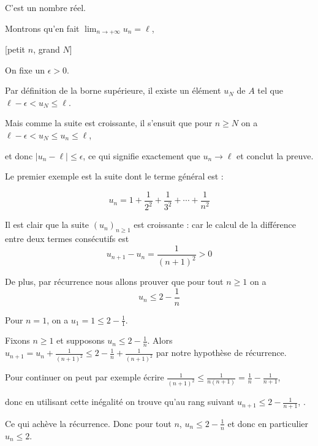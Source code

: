 C'est un nombre réel.

\change

Montrons qu'en fait $\lim_{n\to +\infty} u_n=\ell$,

\change

[petit $n$, grand $N$]

On fixe un $\epsilon >0$. 


Par définition de la borne supérieure, il existe un élément $u_N$ de $A$ tel que
 $\ell-\epsilon < u_N \leq \ell$. 
 

Mais comme la suite est croissante, il s'ensuit que pour $n\geq N$ on a 
$\ell-\epsilon < u_N \leq u_n \leq \ell$, 
 
et donc $\lvert u_n-\ell \rvert \leq \epsilon$, ce qui signifie exactement que $u_n \to \ell$
et conclut la preuve.


 \diapo

Le premier exemple est la suite dont le terme général est :

$$ u_n =1+\frac{1}{2^2} +\frac{1}{3^2}+\cdots+\frac{1}{n^2} $$


\change

Il est clair que la suite $(u_n)_{n\geq 1}$ est croissante : 
car le calcul de la différence entre deux termes consécutifs est
$$u_{n+1}-u_n= \frac{1}{(n+1)^2}>0$$ 

\change

De plus, par récurrence nous allons prouver que pour tout  
$n\geq 1$ on a $$u_n\leq 2 - \frac{1}{n} $$

\change

Pour $n=1$, on a $u_1=1\leq 2 - \frac{1}{1}$.

\change

Fixons $n\geq 1$ et supposons $u_n\leq 2 - \frac{1}{n}$. 
Alors $u_{n+1}=u_n+ \frac{1}{(n+1)^2}\leq  2 - \frac{1}{n}+ \frac{1}{(n+1)^2}$
par notre hypothèse de récurrence.

Pour continuer on peut par exemple écrire 
$\frac{1}{(n+1)^2}\leq \frac{1}{n(n+1)}=\frac{1}{n}-\frac{1}{n+1}$, 

donc en utilisant cette inégalité on trouve
qu'au rang suivant $u_{n+1}\leq 2-\frac{1}{n+1}$, .

\change

Ce qui achève la récurrence.
Donc pour tout $n$, $u_n\leq 2 - \frac{1}{n} $ et donc en particulier $u_n \le 2$.

